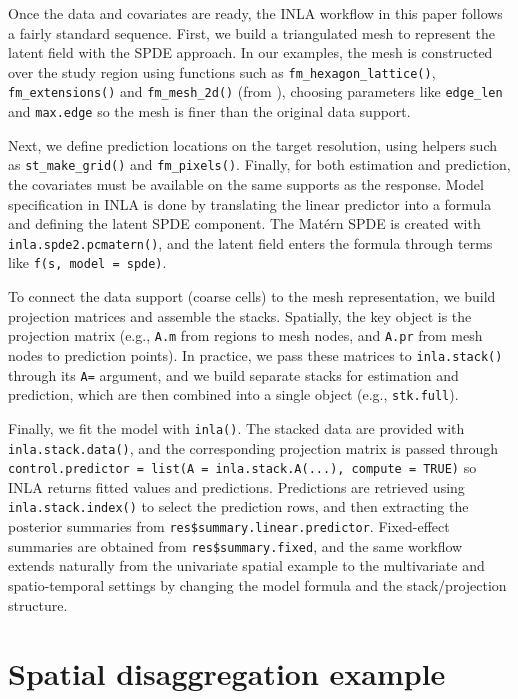 Once the data and covariates are ready, the INLA workflow in this paper follows a fairly standard sequence. First, we build a triangulated mesh to represent the latent field with the SPDE approach. In our examples, the mesh is constructed over the study region using functions such as \texttt{fm\_hexagon\_lattice()}, \texttt{fm\_extensions()} and \texttt{fm\_mesh\_2d()} (from ), choosing parameters like \texttt{edge\_len} and \texttt{max.edge} so the mesh is finer than the original data support.

Next, we define prediction locations on the target resolution, using helpers such as \texttt{st\_make\_grid()} and \texttt{fm\_pixels()}. Finally, for both estimation and prediction, the covariates must be available on the same supports as the response. Model specification in INLA is done by translating the linear predictor into a formula and defining the latent SPDE component. The Matérn SPDE is created with \texttt{inla.spde2.pcmatern()}, and the latent field enters the formula through terms like \texttt{f(s,\ model\ =\ spde)}.

To connect the data support (coarse cells) to the mesh representation, we build projection matrices and assemble the stacks. Spatially, the key object is the projection matrix (e.g., \texttt{A.m} from regions to mesh nodes, and \texttt{A.pr} from mesh nodes to prediction points). In practice, we pass these matrices to \texttt{inla.stack()} through its \texttt{A=} argument, and we build separate stacks for estimation and prediction, which are then combined into a single object (e.g., \texttt{stk.full}).

Finally, we fit the model with \texttt{inla()}. The stacked data are provided with \texttt{inla.stack.data()}, and the corresponding projection matrix is passed through \texttt{control.predictor\ =\ list(A\ =\ inla.stack.A(...),\ compute\ =\ TRUE)} so INLA returns fitted values and predictions. Predictions are retrieved using \texttt{inla.stack.index()} to select the prediction rows, and then extracting the posterior summaries from \texttt{res\$summary.linear.predictor}. Fixed-effect summaries are obtained from \texttt{res\$summary.fixed}, and the same workflow extends naturally from the univariate spatial example to the multivariate and spatio-temporal settings by changing the model formula and the stack/projection structure.

\section{Spatial disaggregation example}\label{sec:spatial-dis}

